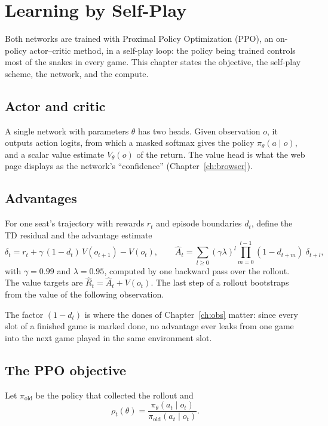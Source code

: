 \chapter{Learning by Self-Play}\label{ch:learn}

Both networks are trained with Proximal Policy Optimization (PPO), an on-policy
actor--critic method, in a self-play loop: the policy being trained controls most of the
snakes in every game. This chapter states the objective, the self-play scheme, the
network, and the compute.

\section{Actor and critic}

A single network with parameters $\theta$ has two heads. Given observation $o$, it outputs
action logits, from which a masked softmax gives the policy $\pi_\theta(a\mid o)$, and a
scalar value estimate $V_\theta(o)$ of the return. The value head is what the web page
displays as the network's ``confidence'' (Chapter~\ref{ch:browser}).

\section{Advantages}

\begin{defbox}
For one seat's trajectory with rewards $r_t$ and episode boundaries $d_t$, define the TD
residual and the advantage estimate
\[
  \delta_t = r_t + \gamma\,(1-d_t)\,V(o_{t+1}) - V(o_t),
  \qquad
  \hat A_t = \sum_{l\ge 0} (\gamma\lambda)^l \prod_{m=0}^{l-1}(1-d_{t+m})\;\delta_{t+l},
\]
with $\gamma=0.99$ and $\lambda=0.95$, computed by one backward pass over the rollout. The
value targets are $\hat R_t = \hat A_t + V(o_t)$. The last step of a rollout bootstraps
from the value of the following observation.
\end{defbox}

The factor $(1-d_t)$ is where the dones of Chapter~\ref{ch:obs} matter: since every slot of
a finished game is marked done, no advantage ever leaks from one game into the next game
played in the same environment slot.

\section{The PPO objective}

Let $\pi_{\text{old}}$ be the policy that collected the rollout and
\[
  \rho_t(\theta) = \frac{\pi_\theta(a_t\mid o_t)}{\pi_{\text{old}}(a_t\mid o_t)}.
\]

